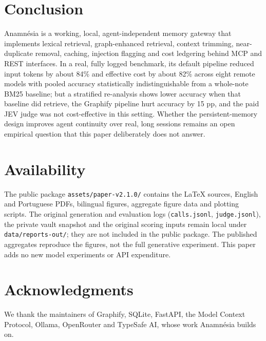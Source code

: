 \documentclass[conference,onecolumn,11pt]{IEEEtran}
\newcommand{\anam}{Anam\-n\'esia}
\begin{document}
\section{Conclusion}
\anam{} is a working, local, agent-independent memory gateway that implements lexical retrieval, graph-enhanced retrieval, context trimming, near-duplicate removal, caching, injection flagging and cost ledgering behind MCP and REST interfaces. In a real, fully logged benchmark, its default pipeline reduced input tokens by about 84\% and effective cost by about 82\% across eight remote models with pooled accuracy statistically indistinguishable from a whole-note BM25 baseline; but a stratified re-analysis shows lower accuracy when that baseline did retrieve, the Graphify pipeline hurt accuracy by 15 pp, and the paid JEV judge was not cost-effective in this setting. Whether the persistent-memory design improves agent continuity over real, long sessions remains an open empirical question that this paper deliberately does not answer.

\section*{Availability}
The public package \texttt{assets/paper-v2.1.0/} contains the LaTeX sources, English and Portuguese PDFs, bilingual figures, aggregate figure data and plotting scripts. The original generation and evaluation logs (\texttt{calls.jsonl}, \texttt{judge.jsonl}), the private vault snapshot and the original scoring inputs remain local under \texttt{data/reports-out/}; they are not included in the public package. The published aggregates reproduce the figures, not the full generative experiment. This paper adds no new model experiments or API expenditure.

\section*{Acknowledgments}
We thank the maintainers of Graphify, SQLite, FastAPI, the Model Context Protocol, Ollama, OpenRouter and TypeSafe AI, whose work \anam{} builds on.



\end{document}

